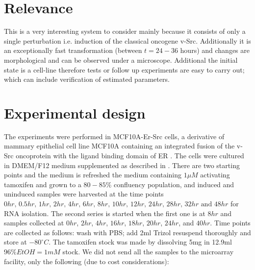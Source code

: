\section{Relevance}
\label{sec:relevance}

This is a very interesting system to consider mainly because it consists of only a single perturbation i.e. induction of the classical oncogene v-Src. Additionally it is an exceptionally fast transformation (between $t=24-36$ hours) and changes are morphological and can be observed under a microscope. Additional the initial state is a cell-line therefore tests or follow up experiments are easy to carry out; which can include verification of estimated parameters.

\section{Experimental design}
\label{sec:experimental-design}



The experiments were performed in MCF10A-Er-Src cells, a derivative of mammary epithelial cell line MCF10A containing an integrated fusion of the v-Src oncoprotein with the ligand binding domain of ER \citep{Hirsch:2010ec,Iliopoulos:2009do}. The cells were cultured in DMEM/F12 medium supplemented as described in \cite{Debnath:2003km}. There are two starting points and the medium is refreshed the medium containing $1 \mu M$ activating tamoxifen and grown to a $80 - 85\%$ confluency population, and induced and uninduced samples were harvested at the time points $0hr,\, 0.5hr,\, 1hr,\, 2hr,\, 4hr,\, 6hr,\, 8hr,\, 10hr,\, 12hr,\, 24hr,\, 28hr,\, 32hr \text{ and } 48hr$ for RNA isolation. The second series is started when the first one is at $8hr$ and samples collected at $0hr$, $2hr$, $4hr$, $16hr$, $18hr$, $20hr$, $24hr$, and $40hr$. Time points are collected as follows: wash with PBS; add 2ml Trizol resuspend thoroughly and store at $-80^{\circ}C$. The tamoxifen stock was made by dissolving 5mg in 12.9ml $96\% EtOH = 1mM$ stock. We did not send all the samples to the microarray facility, only the following (due to cost considerations): 

